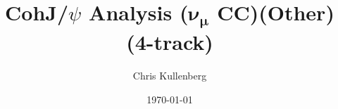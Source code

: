 \title{CohJ/$\psi$ Analysis ($\boldsymbol{\nu_\mu}$ \textbf{CC})(\textbf{Other})(\textbf{4-track})}
\author{Chris Kullenberg}
\date{\today}
